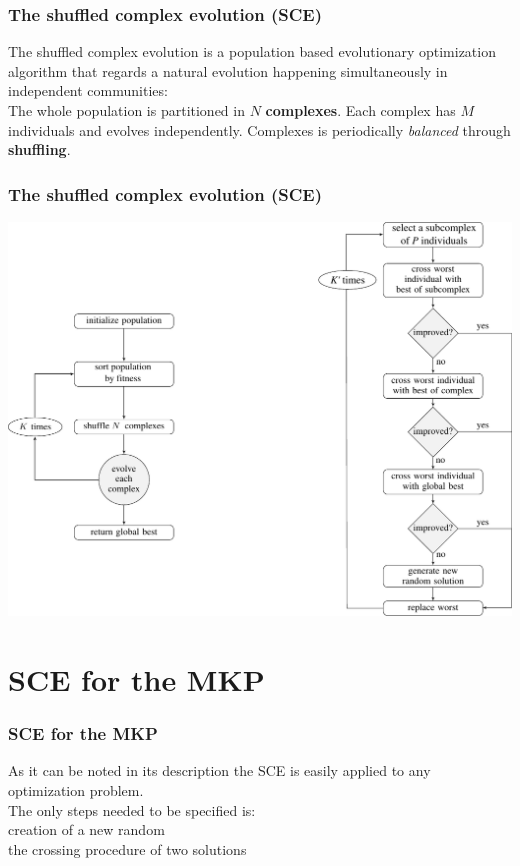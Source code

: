 \documentclass[10pt,fleqn]{beamer}
\begin{document}
\begin{frame}
	\frametitle{The shuffled complex evolution (SCE)}
The shuffled complex evolution is a population
based evolutionary optimization algorithm that regards a natural 
evolution happening simultaneously in independent communities: \\ \pause
\vfill
The whole population is partitioned in $N$ {\bf complexes}.
Each complex has $M$ individuals and evolves independently.
\vfill
Complexes is periodically {\it balanced} through {\bf shuffling}.
\end{frame}

\begin{frame}
	\frametitle{The shuffled complex evolution (SCE)}
\begin{center}
		\includegraphics[scale=0.48]{sceflow}
\end{center}
\end{frame}

\section{SCE for the MKP}

\begin{frame}
	\frametitle{SCE for the MKP}
As it can be noted in its description the SCE is easily applied to any
optimization problem. \\
\vspace*{10pt}
	The only steps needed to be specified is:\\
	 creation of a new random \\
	 the crossing procedure of two solutions
\end{frame}
\end{document}
